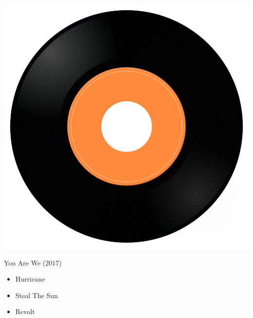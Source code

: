 \begin{minipage}[t]{0.25\textwidth}\vspace{0pt}
\captionsetup{type=figure}
\includegraphics[width=\textwidth]{Images/cover.png}
\caption*{You Are We (2017)}
\end{minipage}
\begin{minipage}[t]{0.25\textwidth}\vspace{0pt}
\begin{itemize}[nosep,leftmargin=1em,labelwidth=*,align=left]
	\setlength{\itemsep}{0pt}
	\item Hurricane
	\item Steal The Sun
	\item Revolt
\end{itemize}
\end{minipage}
